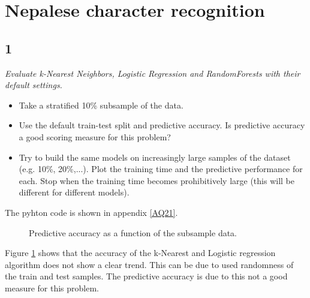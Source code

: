 \documentclass[a4paper,12pt]{article}
\begin{document}

\tableofcontents %

\section*{Nepalese character recognition}
\subsection*{1}
{\it Evaluate k-Nearest Neighbors, Logistic Regression and RandomForests with their default
settings.
\begin{itemize}
\item{Take a stratified 10\% subsample of the data.}
\item{Use the default train-test split and predictive accuracy. Is predictive accuracy a good scoring measure for this problem?}
\item{Try to build the same models on increasingly large samples of the dataset (e.g. 10\%,
20\%,...). Plot the training time and the predictive performance for each. Stop when the
training time becomes prohibitively large (this will be different for different models).}
\end{itemize}
The pyhton code is shown in appendix \ref{AQ21}.

\begin{figure}[H]
\hfill
{}
\hfill
\caption{Predictive accuracy as a function of the subsample data.}
\label{Q21image}
\end{figure}

Figure \ref{Q21image} shows that the accuracy of the k-Nearest and Logistic regression algorithm does not show a clear trend. This can be due to used randomness of the train and test samples. The predictive accuracy is due to this not a good measure for this problem. 

}
\end{document}
